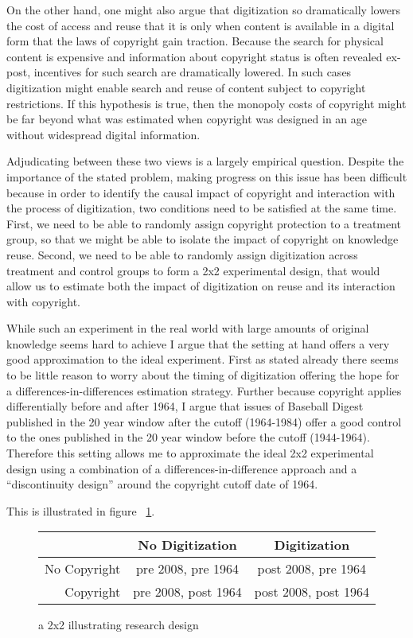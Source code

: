 \documentclass[12pt]{article}
\begin{document}
On the other hand, one might also argue that digitization so dramatically lowers the cost of access and reuse that it is only when content is available in a digital form that the laws of copyright gain traction. Because the search for physical content is expensive and information about copyright status is often revealed ex-post, incentives for such search are dramatically lowered. In such cases digitization might enable search and reuse of content subject to copyright restrictions. If this hypothesis is true, then the monopoly costs of copyright might be far beyond what was estimated when copyright was designed in an age without widespread digital information.

Adjudicating between these two views is a largely empirical question. Despite the importance of the stated problem, making progress on this issue has been difficult because in order to identify the causal impact of copyright and interaction with the process of digitization, two conditions need to be satisfied at the same time. First, we need to be able to randomly assign copyright protection to a treatment group, so that we might be able to isolate the impact of copyright on knowledge reuse. Second, we need to be able to randomly assign digitization across treatment and control groups to form a 2x2 experimental design, that would allow us to estimate both the impact of digitization on reuse and its interaction with copyright. 

While such an experiment in the real world with large amounts of original knowledge seems hard to achieve I argue that the setting at hand offers a very good approximation to the ideal experiment. First as stated already there seems to be little reason to worry about the timing of digitization offering the hope for a differences-in-differences estimation strategy. Further because copyright applies differentially before and after 1964, I argue that issues of Baseball Digest published in the 20 year window after the cutoff (1964-1984) offer a good control to the ones published in the 20 year window before the cutoff (1944-1964). Therefore this setting allows me to approximate the ideal 2x2 experimental design using a combination of a differences-in-difference approach and a ``discontinuity design'' around the copyright cutoff date of 1964. 

This is illustrated in figure ~\ref{fig:designtable}. 

\begin{figure}[h]
\centering
\begin{tabular}{ | r | c | c | }
  \hline                        
   & No Digitization & Digitization \\
  \hline                        
  No Copyright & pre 2008, pre 1964 & post 2008, pre 1964 \\
  \hline                        
  Copyright & pre 2008, post 1964 & post 2008, post 1964 \\
  \hline  
\end{tabular}
\caption{a 2x2 illustrating research design}
\label{fig:designtable}
\end{figure}
\end{document}
